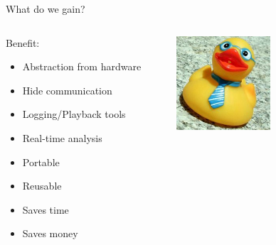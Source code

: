 \documentclass[aspectratio=43]{beamer}
\begin{document}
\begin{frame}{What do we gain?}
\begin{columns}
	\begin{column}{0.55\textwidth}
Benefit:		\begin{itemize}
			\item Abstraction from hardware
                          \item Hide communication
                            \item Logging/Playback tools
                              \item Real-time analysis
                        \item Portable
                        \item Reusable
                        \item Saves time
                        \item Saves money
		\end{itemize} 
        \end{column} 
        \begin{column}{0.45\textwidth} 
          \centering 
          \includegraphics[width=0.5\textwidth]{fig/yay-duckie.jpg} 
        \end{column}
\end{columns}

\end{frame}
\end{document}
